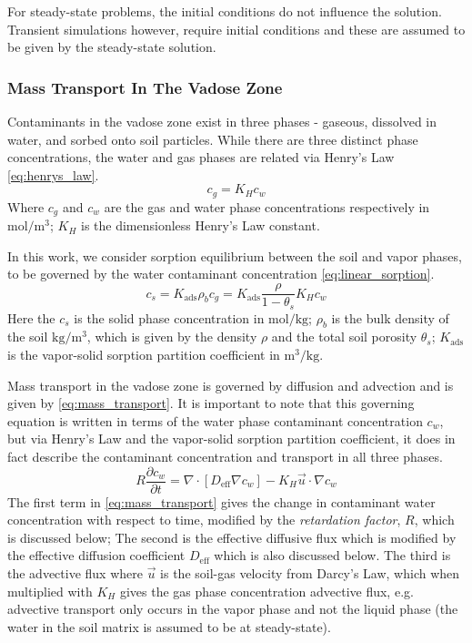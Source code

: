 For steady-state problems, the initial conditions do not influence the solution.
Transient simulations however, require initial conditions and these are assumed to be given by the steady-state solution.\par

\subsubsection{Mass Transport In The Vadose Zone}\label{sec:mass_transport}

Contaminants in the vadose zone exist in three phases - gaseous, dissolved in water, and sorbed onto soil particles.
While there are three distinct phase concentrations, the water and gas phases are related via Henry's Law \eqref{eq:henrys_law}.
\begin{equation}\label{eq:henrys_law}
  c_g = K_H c_w
\end{equation}
Where $c_g$ and $c_w$ are the gas and water phase concentrations respectively in $\mathrm{mol/m^3}$;
$K_H$ is the dimensionless Henry's Law constant.\par

In this work, we consider sorption equilibrium between the soil and vapor phases, to be governed by the water contaminant concentration \eqref{eq:linear_sorption}.
\begin{equation}\label{eq:linear_sorption}
  c_s = K_\mathrm{ads} \rho_b c_g = K_\mathrm{ads} \frac{\rho}{1-\theta_s} K_H c_w
\end{equation}
Here the $c_s$ is the solid phase concentration in $\mathrm{mol/kg}$;
$\rho_b$ is the bulk density of the soil $\mathrm{kg/m^3}$, which is given by the density $\rho$ and the total soil porosity $\theta_s$;
$K_\mathrm{ads}$ is the vapor-solid sorption partition coefficient in $\mathrm{m^3/kg}$.\par

Mass transport in the vadose zone is governed by diffusion and advection and is given by \eqref{eq:mass_transport}.
It is important to note that this governing equation is written in terms of the water phase contaminant concentration $c_w$, but via Henry's Law and the vapor-solid sorption partition coefficient, it does in fact describe the contaminant concentration and transport in all three phases.
\begin{equation}\label{eq:mass_transport}
  R \frac{\partial c_w}{\partial t} =
    \nabla \cdot[ D_\mathrm{eff} \nabla c_w] -
    K_H \vec{u} \cdot \nabla c_w
\end{equation}
The first term in \eqref{eq:mass_transport} gives the change in contaminant water concentration with respect to time, modified by the \textit{retardation factor}, $R$, which is discussed below;
The second is the effective diffusive flux which is modified by the effective diffusion coefficient $D_\mathrm{eff}$ which is also discussed below.
The third is the advective flux where $\vec{u}$ is the soil-gas velocity from Darcy's Law, which when multiplied with $K_H$ gives the gas phase concentration advective flux, e.g. advective transport only occurs in the vapor phase and not the liquid phase (the water in the soil matrix is assumed to be at steady-state).\par

